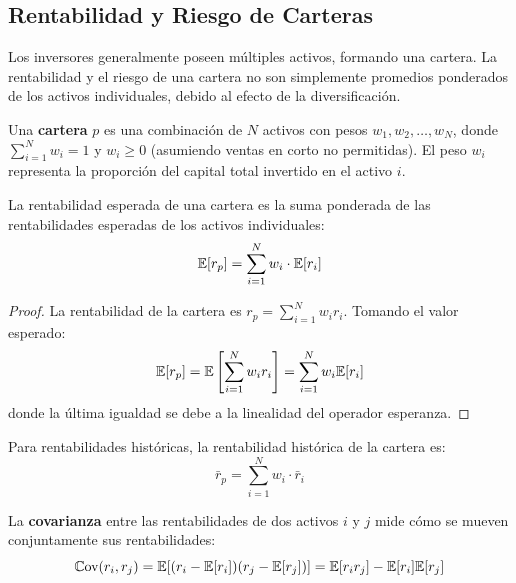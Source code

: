 \subsection{Rentabilidad y Riesgo de Carteras}

Los inversores generalmente poseen múltiples activos, formando una cartera. La rentabilidad y el riesgo de una cartera no son simplemente promedios ponderados de los activos individuales, debido al efecto de la diversificación.

\begin{definicion}
Una \textbf{cartera} $p$ es una combinación de $N$ activos con pesos $w_1, w_2, \ldots, w_N$, donde $\sum_{i=1}^{N} w_i = 1$ y $w_i \geq 0$ (asumiendo ventas en corto no permitidas). El peso $w_i$ representa la proporción del capital total invertido en el activo $i$.
\end{definicion}

\begin{teorema}
La rentabilidad esperada de una cartera es la suma ponderada de las rentabilidades esperadas de los activos individuales:
\begin{equation}
\mathbb{E}[r_p] = \sum_{i=1}^{N} w_i \cdot \mathbb{E}[r_i]
\end{equation}
\end{teorema}

\begin{proof}
La rentabilidad de la cartera es $r_p = \sum_{i=1}^{N} w_i r_i$. Tomando el valor esperado:
$$\mathbb{E}[r_p] = \mathbb{E}\left[\sum_{i=1}^{N} w_i r_i\right] = \sum_{i=1}^{N} w_i \mathbb{E}[r_i]$$
donde la última igualdad se debe a la linealidad del operador esperanza.
\end{proof}

Para rentabilidades históricas, la rentabilidad histórica de la cartera es:
\begin{equation}
\bar{r}_p = \sum_{i=1}^{N} w_i \cdot \bar{r}_i
\end{equation}

\begin{definicion}
La \textbf{covarianza} entre las rentabilidades de dos activos $i$ y $j$ mide cómo se mueven conjuntamente sus rentabilidades:
\begin{equation}
\mathbb{C}\text{ov}(r_i, r_j) = \mathbb{E}[(r_i - \mathbb{E}[r_i])(r_j - \mathbb{E}[r_j])] = \mathbb{E}[r_i r_j] - \mathbb{E}[r_i]\mathbb{E}[r_j]
\end{equation}
\end{definicion}

